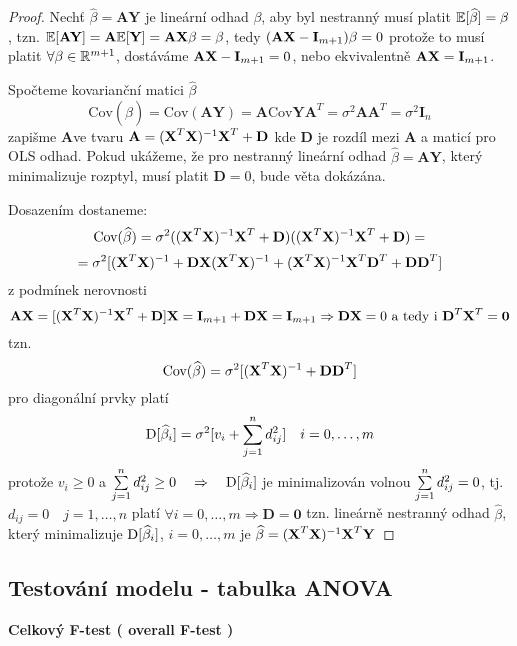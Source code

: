 \begin{proof}
	Nechť $ \widehat{\beta} = \textbf{AY} $ je lineární odhad $ \beta $, aby byl nestranný musí platit $ \mathbb{E} [ \widehat{\beta} ] = \beta $, tzn. $ \mathbb{E} [ \textbf{AY} ] = \textbf{A} \mathbb{E} [ \textbf{Y} ] = \textbf{A} \textbf{X} \beta = \beta $, tedy $ ( \textbf{A} \textbf{X} - \textbf{I}_{m+1} ) \beta = 0 $ protože to musí platit $ \forall \beta \in \mathbb{R} ^{m+1} $, dostáváme $ \textbf{A} \textbf{X} - \textbf{I}_{m+1} = 0 $, nebo ekvivalentně $ \textbf{A} \textbf{X} = \textbf{I}_{m+1} $.
	
	Spočteme kovarianční matici $ \widehat{\beta} $
$$
	\text{Cov}( \widehat{\beta} ) = \text{Cov}( \textbf{AY} ) = \textbf{A} \text{Cov} \textbf{YA}^{T} = \sigma^{2}\textbf{AA}^{T} = \sigma^{2} \textbf{I}_n
$$
zapišme \textbf{A}ve tvaru $ \textbf{A} = ( \textbf{X}^{T} \textbf{X} )^{-1} \textbf{X} ^{T} + \textbf{D} $ kde \textbf{D} je rozdíl mezi \textbf{A} a maticí pro OLS odhad.
Pokud ukážeme, že pro nestranný lineární odhad $ \widehat{\beta} = \textbf{AY} $, který minimalizuje rozptyl, musí platit $ \textbf{D} = 0 $, bude věta dokázána.

Dosazením dostaneme:
 $$
	\text{Cov}( \widehat{\beta} ) = \sigma^{2} ( ( \textbf{X}^{T} \textbf{X} )^{-1} \textbf{X} ^{T} + \textbf{D} ) ( ( \textbf{X}^{T} \textbf{X} )^{-1} \textbf{X} ^{T} + \textbf{D} ) = 
$$
$$
= \sigma^{2} [ ( \textbf{X}^{T} \textbf{X} )^{-1} + \textbf{D} \textbf{X} ( \textbf{X}^{T} \textbf{X} )^{-1} + ( \textbf{X}^{T} \textbf{X} )^{-1} \textbf{X} ^{T} \textbf{D}^{T} + \textbf{DD}^{T} ]
$$
z podmínek nerovnosti
$$
\textbf{A} \textbf{X} = [ ( \textbf{X}^{T} \textbf{X} )^{-1} \textbf{X} ^{T} + \textbf{D} ] \textbf{X} = \textbf{I}_{m+1} + \textbf{D} \textbf{X} = \textbf{I}_{m+1}  \Rightarrow  \textbf{D} \textbf{X} = 0 \text{ a tedy i } \textbf{D}^{T} \textbf{X} ^{T} = \textbf{0}
$$
tzn. 
$$
\text{Cov}( \widehat{\beta} ) = \sigma^{2} [ ( \textbf{X} ^{T} \textbf{X} )^{-1} + \textbf{DD}^{T}  ]
$$
pro diagonální prvky platí
$$
\mathrm{D} [ \widehat{\beta}_i ] = \sigma^{2} [ v_i + \sum\limits_{j=1}^{n} d_{ij}^{2}  ] \quad i = 0, \dots , m
$$
protože $ v_i \geq 0 $ a $ \sum\limits_{j=1}^{n} d_{ij}^{2} \geq 0 \quad \Rightarrow \quad \mathrm{D} [ \widehat{\beta}_i ] $ je minimalizován volnou $ \sum\limits_{j=1}^{n} d_{ij}^{2} = 0 $, tj. $ d_{ij} = 0 \quad j = 1, \dots , n $ platí $ \forall i = 0, \dots , m \Rightarrow \textbf{D} = \textbf{0} $ tzn. lineárně nestranný odhad $ \widehat{\beta} $, který minimalizuje $ \mathrm{D} [ \widehat{\beta}_i ] $, $ i = 0, \dots , m $ je $ \widehat{\beta} = ( \textbf{X} ^{T} \textbf{X} )^{-1} \textbf{X} ^{T} \textbf{Y} $
\end{proof}
\subsection{Testování modelu - tabulka ANOVA}
\textbf{Celkový F-test ( overall F-test )}

